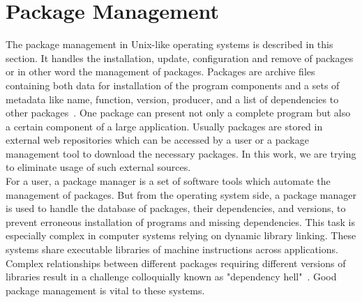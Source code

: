 \section{Package Management} \label{sec:pm}
The package management in Unix-like operating systems is described in this section.
It handles the installation, update, configuration and remove of packages or in other word the management of packages.
Packages are archive files containing both data for installation of the program components and a sets of metadata like name, function, version, producer, and a list of dependencies to other packages~\cite*{opium}. 
One package can present not only a complete program but also a certain component of a large application.
Usually packages are stored in external web repositories which can be accessed by a user or a package management tool to download the necessary packages. %
In this work, we are trying to eliminate usage of such external sources.\\
For a user, a package manager is a set of software tools which automate the management of packages.
But from the operating system side, a package manager is used to handle the database of packages, their dependencies, and versions, to prevent erroneous installation of programs and missing dependencies.
This task is especially complex in computer systems relying on dynamic library linking. 
These systems share executable libraries of machine instructions across  applications. 
Complex relationships between different packages requiring different versions of libraries result in a challenge colloquially known as "dependency hell"~\cite*{linuxgeek}.
Good package management is vital to these systems.\\
